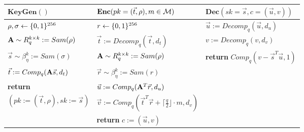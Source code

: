 \iflncs
\begin{table}[!h]
\begin{tabular}{|l|l|l|}
\hline
$\textbf{KeyGen}()$&$\textbf{Enc}(pk = (\vec{t}, \rho), m \in
                   \mathcal{M})$&$\textbf{Dec}(sk = \vec{s}, c = (\vec{u},
                            v))$\\
\hline
$\rho, \sigma \gets \{0,1\}^{256}$&$r \gets \{0,1\}^{256}$ &$\vec{u}
                                                            :=
                                                            Decomp_q(\vec{u},
                                                            d_u)$\\
${\bf A} \sim R_q^{k\times k} := Sam(\rho)$&$\vec{t} :=
                                             Decomp_q(\vec{t},
                                             d_t)$&$v :=
                                                    Decomp_q(v,
                                                    d_v)$\\
$\vec{s} \sim \beta^k_\eta := Sam(\sigma)$&${\bf A} \sim R_q^{k\times
                                            k} := Sam(\rho)$& {\bf
                                                              return}
                                                              $Comp_q(v-\vec{s}^T\vec{u},
                                                              1)$\\
$\vec{t} := Comp_q({\bf A}\vec{s}, d_t)$&$\vec{r} \sim
                                              \beta^k_\eta :=
                                              Sam(r)$&\\
{\bf return} &$\vec{u} :=
                                                       Comp_q({\bf
                                                       A}^T\vec{r},
                                                       d_u)$&\\
  $(pk := (\vec{t}, \rho), sk := \vec{s})$&$\vec{v} := Comp_q(\vec{t}^T\vec{r} +
  \lceil\frac{q}{2}\rfloor\cdot m, d_v)$&\\
&{\bf return} $c := (\vec{u}, v)$&\\
\hline
\end{tabular}
\end{table}

\else

